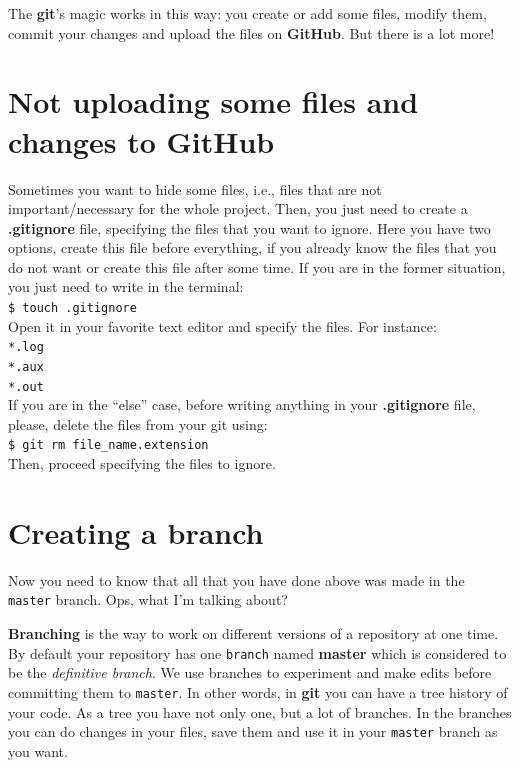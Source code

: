 \documentclass[12pt,a4paper,titlepage,brazil]{article}
\begin{document}
{The {\bf git}'s magic works in this way: you create or add some files, modify them, commit your changes and upload the files on {\bf GitHub}. But there is a lot more!


\section{Not uploading some files and changes to GitHub}

Sometimes you want to hide some files, i.e., files that are not important/necessary for the whole project. Then, you just need to create a {\bf .gitignore} file, specifying the files that you want to ignore. Here you have two options, create this file before everything, if you already know the files that you do not want or create this file after some time. If you are in the former situation, you just need to write in the terminal:\\

\texttt{\$ touch .gitignore}\\

Open it in your favorite text editor and specify the files. For instance:\\

\texttt{*.log}\\

\texttt{*.aux}\\

\texttt{*.out}\\

If you are in the ``else'' case, before writing anything in your {\bf .gitignore} file, please, delete the files from your git using:\\

\texttt{\$ git rm file\_name.extension}\\

Then, proceed specifying the files to ignore.


\section{Creating a branch}

Now you need to know that all that you have done above was made in the \texttt{master} branch. Ops, what I'm talking about?

{\bf Branching} is the way to work on different versions of a repository at one time. By default your repository has one \texttt{branch} named {\bf master} which is considered to be the {\em definitive branch}. We use branches to experiment and make edits before committing them to \texttt{master}. In other words, in {\bf git} you can have a tree history of your code. As a tree you have not only one, but a lot of branches. In the branches you can do changes in your files, save them and use it in your \texttt{master} branch as you want.

}
\end{document}
